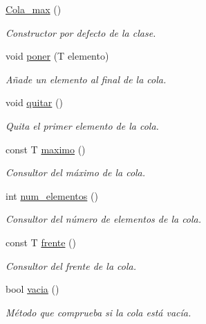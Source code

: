 \begin{DoxyCompactItemize}
\mbox{\label{classCola__max_af9a05d272cd9447f8ac449e8703c8ecb}} 
\hyperlink{classCola__max_af9a05d272cd9447f8ac449e8703c8ecb}{Cola\+\_\+max} ()
\begin{DoxyCompactList}\small\item\em Constructor por defecto de la clase. \end{DoxyCompactList}\item 
void \hyperlink{classCola__max_aaba30a35b89d26659408198baccee5aa}{poner} (T elemento)
\begin{DoxyCompactList}\small\item\em Añade un elemento al final de la cola. \end{DoxyCompactList}\item 
\mbox{\label{classCola__max_a21f1d915c674522d438f8288177e7ecb}} 
void \hyperlink{classCola__max_a21f1d915c674522d438f8288177e7ecb}{quitar} ()
\begin{DoxyCompactList}\small\item\em Quita el primer elemento de la cola. \end{DoxyCompactList}\item 
const T \hyperlink{classCola__max_ad5745cfed3c1d4dc1cceef84c07096b0}{maximo} ()
\begin{DoxyCompactList}\small\item\em Consultor del máximo de la cola. \end{DoxyCompactList}\item 
int \hyperlink{classCola__max_adb26d0a523133af1f48dca6febebf72e}{num\+\_\+elementos} ()
\begin{DoxyCompactList}\small\item\em Consultor del número de elementos de la cola. \end{DoxyCompactList}\item 
const T \hyperlink{classCola__max_a810ac166b15dbd5019109aaf144705e9}{frente} ()
\begin{DoxyCompactList}\small\item\em Consultor del frente de la cola. \end{DoxyCompactList}\item 
bool \hyperlink{classCola__max_af0b18f86af91ef94d7a035f87a4dcb2b}{vacia} ()
\begin{DoxyCompactList}\small\item\em Método que comprueba si la cola está vacía. \end{DoxyCompactList}\end{DoxyCompactItemize}
